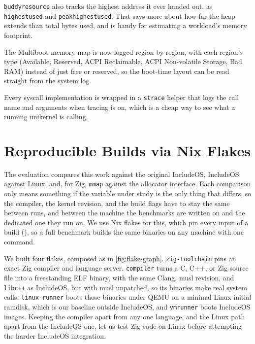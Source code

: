 \documentclass[12pt]{report}
\newcommand{\fullref}[1]{\Cref{#1}}
\renewcommand{\_}{\origunderscore\allowbreak}
\begin{document}
\texttt{buddy\_resource} also tracks the highest address it ever handed out, as \texttt{highest\_used} and \texttt{peak\_highest\_used}. That says more about how far the heap extends than total bytes used, and is handy for estimating a workload's memory footprint.

The Multiboot memory map is now logged region by region, with each region's type (Available, Reserved, ACPI Reclaimable, ACPI Non-volatile Storage, Bad RAM) instead of just free or reserved, so the boot-time layout can be read straight from the system log.

Every syscall implementation is wrapped in a \texttt{strace} helper that logs the call name and arguments when tracing is on, which is a cheap way to see what a running unikernel is calling.

\section{Reproducible Builds via Nix Flakes}
\label{sec:nix-flakes}
\label{sec:reproducible-infra}

The evaluation compares this work against the original IncludeOS, IncludeOS against Linux, and, for Zig, \texttt{mmap} against the allocator interface. Each comparison only means something if the variable under study is the only thing that differs, so the compiler, the kernel revision, and the build flags have to stay the same between runs, and between the machine the benchmarks are written on and the dedicated one they run on. We use Nix flakes for this, which pin every input of a build (\fullref{sec:bg-languages}), so a full benchmark builds the same binaries on any machine with one command.


\FloatBarrier

We built four flakes, composed as in \cref{fig:flake-graph}. \texttt{zig-toolchain} pins an exact Zig compiler and language server. \texttt{compiler} turns a C, C++, or Zig source file into a freestanding ELF binary, with the same Clang, musl revision, and \texttt{libc++} as IncludeOS, but with musl unpatched, so its binaries make real system calls. \texttt{linux-runner} boots those binaries under QEMU on a minimal Linux initial ramdisk, which is our baseline outside IncludeOS, and \texttt{vmrunner} boots IncludeOS images. Keeping the compiler apart from any one language, and the Linux path apart from the IncludeOS one, let us test Zig code on Linux before attempting the harder IncludeOS integration.
\end{document}
